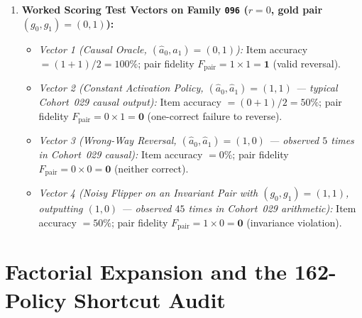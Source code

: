 \begin{workedexample}
\begin{enumerate}
\begin{align*}
      \Delta(1, 0) &= \frac{58}{100}\left(-\frac{1}{40}\right) + \frac{42}{100}\left(+\frac{3}{50}\right) = \frac{-145 + 252}{10000} = +\frac{107}{10000} = +1.070\pp > 0 \implies g(1,0) = \mathbf{1},\\
      \Delta(1, 1) &= \frac{83}{100}\left(-\frac{1}{40}\right) + \frac{17}{100}\left(+\frac{3}{50}\right) = \frac{-415 + 204}{20000} = -\frac{211}{20000} = -1.055\pp < 0 \implies g(1,1) = \mathbf{0}.
    \end{align*}
    Notice that all four exact fractions (\texttt{-57/10000}, \texttt{311/20000}, \texttt{107/10000}, \texttt{-211/20000}) match \texttt{worlds[96]["corners"]} byte-for-byte!
  \item \textbf{Worked Scoring Test Vectors on Family \texttt{096} ($r=0$, gold pair $(g_0, g_1) = (0, 1)$):}
    \begin{itemize}
      \item \emph{Vector 1 (Causal Oracle, $(\hat{a}_0, \hat{a}_1) = (0, 1)$):} Item accuracy $= (1+1)/2 = 100\%$; pair fidelity $F_{\mathrm{pair}} = 1 \times 1 = \mathbf{1}$ (valid reversal).
      \item \emph{Vector 2 (Constant Activation Policy, $(\hat{a}_0, \hat{a}_1) = (1, 1)$ --- typical Cohort~029 causal output):} Item accuracy $= (0+1)/2 = 50\%$; pair fidelity $F_{\mathrm{pair}} = 0 \times 1 = \mathbf{0}$ (one-correct failure to reverse).
      \item \emph{Vector 3 (Wrong-Way Reversal, $(\hat{a}_0, \hat{a}_1) = (1, 0)$ --- observed $5$ times in Cohort~029 causal):} Item accuracy $= 0\%$; pair fidelity $F_{\mathrm{pair}} = 0 \times 0 = \mathbf{0}$ (neither correct).
      \item \emph{Vector 4 (Noisy Flipper on an Invariant Pair with $(g_0, g_1)=(1,1)$, outputting $(1,0)$ --- observed $45$ times in Cohort~029 arithmetic):} Item accuracy $= 50\%$; pair fidelity $F_{\mathrm{pair}} = 1 \times 0 = \mathbf{0}$ (invariance violation).
    \end{itemize}
\end{enumerate}
\end{workedexample}

\section{Factorial Expansion and the 162-Policy Shortcut Audit}

